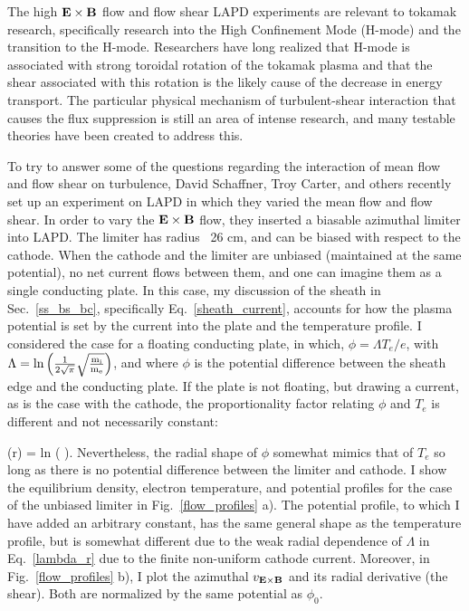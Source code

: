The high ${\bf E \times B}$ flow and flow shear LAPD experiments are relevant to tokamak research, specifically research into the High Confinement Mode (H-mode)
and the transition to the H-mode. Researchers have long realized that H-mode is associated with strong toroidal rotation of the tokamak plasma and that the shear associated with this rotation
is the likely cause of the decrease in energy transport. The particular physical mechanism of turbulent-shear interaction that causes the flux suppression is still an area of intense
research, and many testable theories have been created to address this.

To try to answer some of the questions regarding the interaction of mean flow and flow shear on turbulence, David Schaffner, Troy Carter, and others recently set up an experiment on LAPD
in which they varied the mean flow and flow shear. In order to vary the ${\bf E \times B}$ flow, they inserted a biasable azimuthal limiter into LAPD. The limiter has radius ~26 cm, and
can be biased with respect to the cathode. When the cathode and the limiter are unbiased (maintained at the same potential), no net current flows between them, and one can imagine them
as a single conducting plate. In this case, my discussion of the sheath in Sec.~\ref{ss_bs_bc}, specifically Eq.~\ref{sheath_current}, accounts for how the plasma potential is set by
the current into the plate and the temperature profile. I considered the case for a floating conducting plate, in which, $\phi = \Lambda T_e /e$, with 
$\Lambda = \rm{ln} \left( \frac{1}{2 \sqrt{\pi}} \sqrt{\frac{m_i}{m_e}}  \right)$, and where $\phi$ is the potential difference between the sheath edge and the conducting plate. If the plate is not
floating, but drawing a current, as is the case with the cathode, the proportionality factor relating $\phi$ and $T_e$ is different and not necessarily constant:

\beq
\label{lambda_r}
\Lambda(r) = \rm{ln} \left(  \sqrt{\fmie}  \right).
\eeq
Nevertheless, the radial shape of $\phi$ somewhat mimics that of $T_e$ so long as there is no potential difference between the limiter and cathode. 
I show the equilibrium density, electron temperature, and potential profiles
for the case of the unbiased limiter in Fig.~\ref{flow_profiles} a). The potential profile, to which I have added an arbitrary constant, has the same general shape as the temperature profile,
but is somewhat different due to the weak radial dependence of $\Lambda$ in Eq.~\ref{lambda_r} due to the finite non-uniform cathode current.
Moreover, in Fig.~\ref{flow_profiles} b), I plot the azimuthal $v_{\bf E \times B}$ and its radial derivative (the shear). Both are normalized by the same potential as $\phi_0$.

